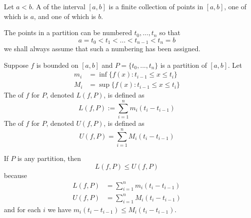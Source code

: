 \documentclass[12pt]{report}
\begin{document}
\begin{defn}{}{}
    Let $a < b$. A  of the interval $[a,b]$ is a finite collection of points in $[a,b]$, one of which is $a$, and one of        which is $b$.
\end{defn}
The points in a partition can be numbered $t_0,...,t_n$ so that \begin{equation}
    a = t_0 < t_1 < ... < t_{n-1} < t_n = b
\end{equation}
we shall always assume that such a numbering has been assigned.

\begin{defn}{}{}
    Suppose $f$ is bounded on $[a,b]$ and $P = \{t_0,...,t_n\}$ is a partition of $[a,b]$. Let \begin{align}
        m_i &= \inf\{f(x):t_{i-1} \leq x \leq t_i\} \\
        M_i &= \sup\{f(x):t_{i-1}\leq x \leq t_i\}
    \end{align}
    The  of $f$ for $P$, denoted $L(f,P)$, is defined as \begin{equation}
        L(f,P) := \sum\limits_{i=1}^nm_i(t_i-t_{i-1})
    \end{equation}
    The  of $f$ for $P$, denoted $U(f,P)$, is defined as \begin{equation}
        U(f,P) = \sum\limits_{i=1}^nM_i(t_i-t_{i-1})
    \end{equation}
\end{defn}


\begin{rmk}{}{}
    If $P$ is any partition, then \begin{equation}
        L(f,P) \leq U(f,P)
    \end{equation}
    because \begin{align*}
        L(f,P) &= \sum\limits_{i=1}^nm_i(t_i-t_{i-1}) \\
        U(f,P) &= \sum\limits_{i=1}^nM_i(t_i - t_{i-1})
    \end{align*}
    and for each $i$ we have $m_i(t_i-t_{i-1}) \leq M_i(t_i-t_{i-1})$.
\end{rmk}
\end{document}
